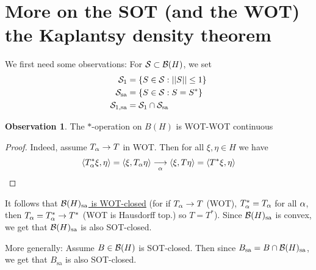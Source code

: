 \documentclass[10pt,english,a4paper]{article}
\theoremstyle{definition}
\newtheorem*{observation}{Observation}
\def\sa{\text{sa}}
\begin{document}
\section{More on the SOT (and the WOT) the Kaplantsy density theorem}
We first need some observations:
For $\mathcal{S} \subset \mathcal{B}(H)$, we set 
\begin{align*}
    \Ss_1 &= \{S \in \Ss: ||S|| \leq 1\} \\
    \Ss_{\sa} &= \{S \in \Ss: S = S^*\} \\
    \Ss_{1,\sa} &=\Ss_1 \cap \Ss_{\sa}
\end{align*}
\begin{observation}
    The $*$-operation on $B(H)$ is WOT-WOT continuous
\end{observation}
\begin{proof}
    Indeed, assume $T_{\alpha} \to T$ in WOT. Then for all 
$\xi,\eta \in H$ we have 
\begin{align*}
    \left\langle T_{\alpha}^{*}\xi,\eta \right\rangle = \left\langle \xi,T_{\alpha}\eta \right\rangle \underset{\alpha}{\longrightarrow}
\left\langle \xi, T\eta \right\rangle = \left\langle T^*\xi,\eta \right\rangle 
\end{align*}
\end{proof}
It follows that \ul{$\Bs(H)_{\sa}$ is WOT-closed}
(for if $T_{\alpha}\to T$ (WOT), $T_{\alpha}^* = T_{\alpha}$ for all $\alpha$,
then $T_{\alpha}= T^{*}_{\alpha}\to T^*$ (WOT is Hausdorff top.) so $T=T^*$).
Since $\Bs(H)_{\sa}$ is convex, we get that 
$\Bs(H)_{\sa}$ is also SOT-closed.

More generally: Assume $B \in \mathcal{B}(H)$ is SOT-closed. Then since 
$B_{\sa} = B\cap \Bs(H)_{\sa}$, we get that $B_{\sa}$ is also SOT-closed.
\end{document}
